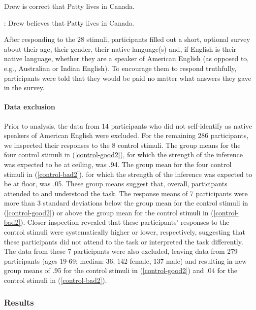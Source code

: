 \documentclass[11pt,fleqn]{article}
\newcommand{\6}{\mbox{$[\hspace*{-.6mm}[$}}
\newcommand{\9}{\mbox{$]\hspace*{-.6mm}]$}}
\begin{document}
\begin{exe}
\ex\label{train2}
\begin{xlist}
 Drew is correct that Patty lives in Canada. 

: Drew believes that Patty lives in Canada.
\end{xlist}
\end{exe}

After responding to the 28 stimuli, participants filled out a short, optional survey about their age, their gender, their native language(s) and, if English is their native language, whether they are a speaker of American English (as opposed to, e.g., Australian or Indian English). To encourage them to respond truthfully, participants were told that they would be paid no matter what answers they gave in the survey.

\paragraph{Data exclusion}

Prior to analysis, the data from 14 participants who did not self-identify as native speakers of American English were excluded. For the remaining 286 participants, we inspected their responses to the 8 control stimuli. The group means for the four control stimuli in (\ref{control-good2}), for which the strength of the inference was expected to be at ceiling, was .94. The group mean for the four control stimuli in (\ref{control-bad2}), for which the strength of the inference was expected to be at floor, was .05. These group means suggest that, overall, participants attended to and understood the task. The response means of 7 participants were more than 3 standard deviations below the group mean for the control stimuli in (\ref{control-good2}) or above the group mean for the control stimuli in (\ref{control-bad2}). Closer inspection revealed that these participants' responses to the control stimuli were systematically higher or lower, respectively, suggesting that these participants did not attend to the task or interpreted the task differently. The data from these 7 participants were also excluded, leaving data from 279 participants (ages 19-69; median: 36; 142 female, 137 male) and resulting in new group means of .95 for the control stimuli in (\ref{control-good2}) and .04 for the control stimuli in (\ref{control-bad2}).

\subsubsection{Results}
\end{document}
